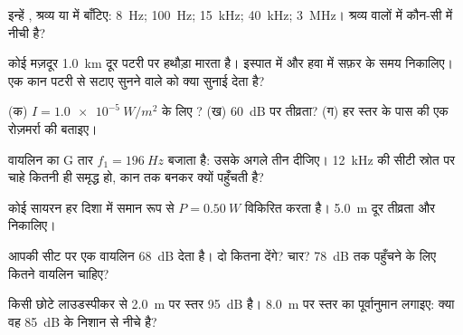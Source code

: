 \begin{exercise}[$\star$]\label{exo:g12:sound-acoustics:2}
इन्हें , श्रव्य  या  में
बाँटिए: \qty{8}{Hz}; \qty{100}{Hz}; \qty{15}{kHz}; \qty{40}{kHz}; \qty{3}{MHz}। श्रव्य वालों में
कौन-सी   में नीची है?
\end{exercise}

\begin{exercise}[$\star$]\label{exo:g12:sound-acoustics:3}
कोई मज़दूर \qty{1.0}{km} दूर पटरी पर हथौड़ा मारता है। इस्पात में और हवा में सफ़र के
समय निकालिए। एक कान पटरी से सटाए सुनने वाले को क्या सुनाई देता है?
\end{exercise}

\begin{exercise}[$\star$]\label{exo:g12:sound-acoustics:4}
(क) $I = \qty{1.0e-5}{W/m^2}$ के लिए ? (ख) \qty{60}{dB} पर तीव्रता? (ग) हर स्तर
के पास की एक रोज़मर्रा की  बताइए।
\end{exercise}

\begin{exercise}[$\star$]\label{exo:g12:sound-acoustics:5}
वायलिन का G तार $f_1 = \qty{196}{Hz}$ बजाता है: उसके अगले तीन 
दीजिए। \qty{12}{kHz} की सीटी स्रोत पर चाहे कितनी ही समृद्ध हो, कान तक
 बनकर क्यों पहुँचती है?
\end{exercise}

\begin{exercise}[$\star\star$]\label{exo:g12:sound-acoustics:6}
कोई सायरन हर दिशा में समान रूप से $P = \qty{0.50}{W}$ विकिरित करता है। \qty{5.0}{m} दूर
तीव्रता और  निकालिए।
\end{exercise}

\begin{exercise}[$\star\star$]\label{exo:g12:sound-acoustics:7}
आपकी सीट पर एक वायलिन \qty{68}{dB} देता है। दो कितना देंगे? चार? \qty{78}{dB} तक
पहुँचने के लिए कितने वायलिन चाहिए?
\end{exercise}

\begin{exercise}[$\star\star$]\label{exo:g12:sound-acoustics:8}
किसी छोटे लाउडस्पीकर से \qty{2.0}{m} पर स्तर \qty{95}{dB} है। \qty{8.0}{m} पर स्तर का
पूर्वानुमान लगाइए: क्या वह \qty{85}{dB} के निशान से नीचे है?
\end{exercise}

